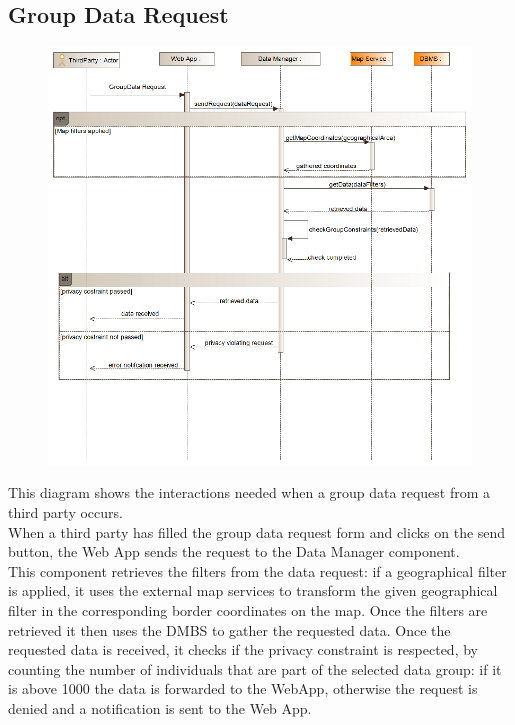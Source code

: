 \subsection{Group Data Request}
\begin{figure}[H]
\centering
\includegraphics[width=\linewidth]{resources/uml/sequence/RequestGroupData.png}
\end{figure}
This diagram shows the interactions needed when a group data request from a third party occurs.\\
When a third party has filled the group data request form and clicks on the send button, the Web App sends the request to the Data Manager component.\\
This component retrieves the filters from the data request: if a geographical filter is applied, it uses the external map services to transform the given geographical filter in the corresponding border coordinates on the map.
Once the filters are retrieved it then uses the DMBS to gather the requested data.
Once the requested data is received, it checks if the privacy constraint is respected, by counting the number of individuals that are part of the selected data group: if it is above 1000 the data is forwarded to the WebApp, otherwise the request is denied and a notification is sent to the Web App.


